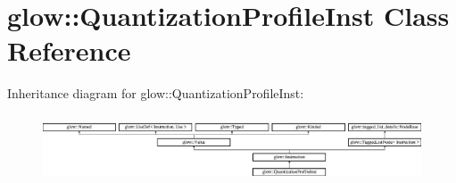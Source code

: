 \hypertarget{classglow_1_1_quantization_profile_inst}{}\section{glow\+:\+:Quantization\+Profile\+Inst Class Reference}
\label{classglow_1_1_quantization_profile_inst}
Inheritance diagram for glow\+:\+:Quantization\+Profile\+Inst\+:\begin{figure}[H]
\begin{center}
\leavevmode
\includegraphics[height=1.991111cm]{classglow_1_1_quantization_profile_inst}
\end{center}
\end{figure}
